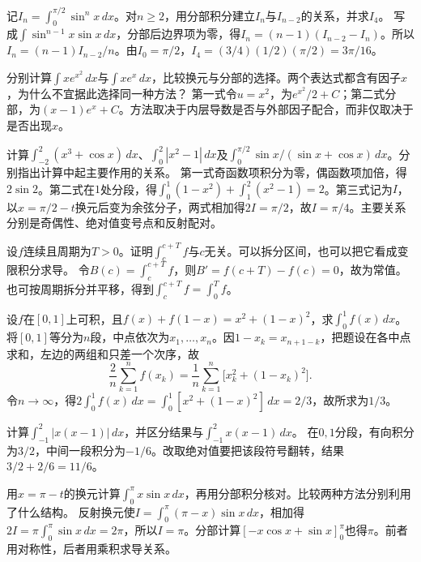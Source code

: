 记\(I_n=\int_0^{\pi/2}\sin^nx\,dx\)。对\(n\ge2\)，用分部积分建立\(I_n\)与\(I_{n-2}\)的关系，并求\(I_4\)。
\solutionanswer
写成\(\int\sin^{n-1}x\sin x\,dx\)，分部后边界项为零，得\(I_n=(n-1)(I_{n-2}-I_n)\)。所以\(I_n=(n-1)I_{n-2}/n\)。由\(I_0=\pi/2\)，\(I_4=(3/4)(1/2)(\pi/2)=3\pi/16\)。


分别计算\(\int xe^{x^2}\,dx\)与\(\int xe^x\,dx\)，比较换元与分部的选择。两个表达式都含有因子\(x\)，为什么不宜据此选择同一种方法？
\solutionanswer
第一式令\(u=x^2\)，为\(e^{x^2}/2+C\)；第二式分部，为\((x-1)e^x+C\)。方法取决于内层导数是否与外部因子配合，而非仅取决于是否出现\(x\)。


计算\(\int_{-2}^2(x^3+\cos x)\,dx\)、\(\int_0^2|x^2-1|\,dx\)及\(\int_0^{\pi/2}\sin x/(\sin x+\cos x)\,dx\)。分别指出计算中起主要作用的关系。
\solutionanswer
第一式奇函数项积分为零，偶函数项加倍，得\(2\sin2\)。第二式在\(1\)处分段，得\(\int_0^1(1-x^2)+\int_1^2(x^2-1)=2\)。第三式记为\(I\)，以\(x=\pi/2-t\)换元后变为余弦分子，两式相加得\(2I=\pi/2\)，故\(I=\pi/4\)。主要关系分别是奇偶性、绝对值变号点和反射配对。


设\(f\)连续且周期为\(T>0\)。证明\(\int_c^{c+T}f\)与\(c\)无关。可以拆分区间，也可以把它看成变限积分求导。
\solutionanswer
令\(B(c)=\int_c^{c+T}f\)，则\(B'=f(c+T)-f(c)=0\)，故为常值。也可按周期拆分并平移，得到\(\int_c^{c+T}f=\int_0^Tf\)。


设\(f\)在\([0,1]\)上可积，且\(f(x)+f(1-x)=x^2+(1-x)^2\)，求\(\int_0^1f(x)\,dx\)。
\solutionanswer
将\([0,1]\)等分为\(n\)段，中点依次为\(x_1,\ldots,x_n\)。因\(1-x_k=x_{n+1-k}\)，把题设在各中点求和，左边的两组和只差一个次序，故
\[
 \frac{2}{n}\sum_{k=1}^n f(x_k)
 =\frac{1}{n}\sum_{k=1}^n \bigl[x_k^2+(1-x_k)^2\bigr].
\]
令\(n\to\infty\)，得\(2\int_0^1 f(x)\,dx=\int_0^1[x^2+(1-x)^2]\,dx=2/3\)，故所求为\(1/3\)。


计算\(\int_{-1}^2|x(x-1)|\,dx\)，并区分结果与\(\int_{-1}^2x(x-1)\,dx\)。
\solutionanswer
在\(0,1\)分段，有向积分为\(3/2\)，中间一段积分为\(-1/6\)。改取绝对值要把该段符号翻转，结果\(3/2+2/6=11/6\)。


用\(x=\pi-t\)的换元计算\(\int_0^\pi x\sin x\,dx\)，再用分部积分核对。比较两种方法分别利用了什么结构。
\solutionanswer
反射换元使\(I=\int_0^\pi(\pi-x)\sin x\,dx\)，相加得\(2I=\pi\int_0^\pi\sin x\,dx=2\pi\)，所以\(I=\pi\)。分部计算\([-x\cos x+\sin x]_0^\pi\)也得\(\pi\)。前者用对称性，后者用乘积求导关系。


